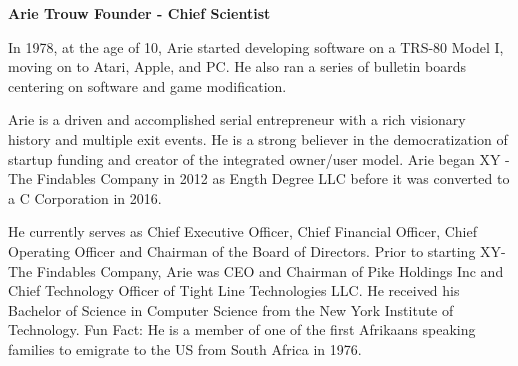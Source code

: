 \documentclass{article}
\begin{document}
\begin {framed}
\begin {center}
\textbf{Arie Trouw Founder - Chief Scientist}\par
\end {center}
In 1978, at the age of 10, Arie started developing software on a TRS-80 Model I, moving on to Atari, Apple, and PC.  He also ran a series of bulletin boards centering on software and game modification.

Arie is a driven and accomplished serial entrepreneur with a rich visionary history and multiple exit events. He is a strong believer in the democratization of startup funding and creator of the integrated owner/user model. Arie began XY - The Findables Company in 2012 as Ength Degree LLC before it was converted to a C Corporation in 2016.

He currently serves as Chief Executive Officer, Chief Financial Officer, Chief Operating Officer and Chairman of the Board of Directors. Prior to starting XY-The Findables Company, Arie was CEO and Chairman of Pike Holdings Inc and Chief Technology Officer of Tight Line Technologies LLC. He received his Bachelor of Science in Computer Science from the New York Institute of Technology. Fun Fact: He is a member of one of the first Afrikaans speaking families to emigrate to the US from South Africa in 1976.
\end {framed}
\end{document}
